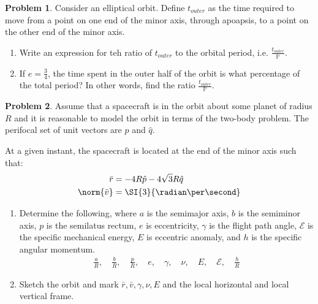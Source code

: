\documentclass[10pt]{article}
\theoremstyle{definition}
\newtheorem{prob}{Problem}[section]
\newenvironment{subprob}%
{\renewcommand{\theenumi}{\alph{enumi}}\renewcommand{\labelenumi}{(\theenumi)}\begin{enumerate}}%
{\end{enumerate}}%
\begin{document}
\clearpage\newpage
\begin{prob}
Consider an elliptical  orbit.
Define \( t_{outer} \) as the time required to move from a point on one end of the minor axis, through apoapsis, to a point on the other end of the minor axis.

\begin{subprob}
    \item Write an expression for teh ratio of \( t_{outer} \) to the orbital period, i.e. \(\frac{t_{outer}}{\mathbb{P}}\).
    \item If \( e = \frac{3}{4} \), the time spent in the outer half of the orbit is what percentage of the total period? In other words, find the ratio \( \frac{t_{outer}}{\mathbb{P}} \).
\end{subprob}
\end{prob}

\begin{prob}
    Assume that a spacecraft is in the orbit about some planet of radius \( R\) and it is reasonable to model the orbit in terms of the two-body problem.
    The perifocal set of unit vectors are \( \hat p \) and \( \hat q \).

    At a given instant, the spacecraft is located at the end of the minor axis such that:
    \begin{align*}
        \bar r &= -4 R \hat p - 4 \sqrt{3} R \hat q \\
        \norm{\bar v} &= \SI{3}{\radian\per\second}
    \end{align*}

\begin{subprob}
\item Determine the following, where \( a \) is the semimajor axis, \( b \) is the semiminor axis, \( p \) is the semilatus rectum, \( e \) is eccentricity, \( \gamma \) is the flight path angle, \( \mathcal{E} \) is the specific mechanical energy, \( E \) is eccentric anomaly, and \( h \) is the specific angular momentum.
        \begin{align*}
            \frac{a}{R}, \quad \frac{b}{R}, \quad \frac{p}{R}, \quad e, \quad \gamma, \quad \nu, \quad E, \quad \mathcal{E}, \quad \frac{h}{R}
        \end{align*}
    \item Sketch the orbit and mark \( \bar r, \bar v , \gamma, \nu, E\) and the local horizontal and local vertical frame.
\end{subprob}
\end{prob}
\end{document}
